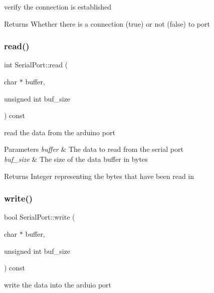verify the connection is established 

\begin{DoxyReturn}{Returns}
Whether there is a connection (true) or not (false) to port 
\end{DoxyReturn}
\mbox{\label{classSerialPort_a23cbb94f2cc75c9f0d40735dfb6e1558}} 
\subsubsection{\texorpdfstring{read()}{read()}}
{\footnotesize\ttfamily int Serial\+Port\+::read (\begin{DoxyParamCaption}\item[{char $\ast$}]{buffer,  }\item[{unsigned int}]{buf\+\_\+size }\end{DoxyParamCaption}) const}



read the data from the arduino port 


\begin{DoxyParams}{Parameters}
{\em buffer} & The data to read from the serial port \\
\hline
{\em buf\+\_\+size} & The size of the data buffer in bytes \\
\hline
\end{DoxyParams}
\begin{DoxyReturn}{Returns}
Integer representing the bytes that have been read in 
\end{DoxyReturn}
\mbox{\label{classSerialPort_aacd98ecf14374a7776efe2a11ec6a541}} 
\subsubsection{\texorpdfstring{write()}{write()}}
{\footnotesize\ttfamily bool Serial\+Port\+::write (\begin{DoxyParamCaption}\item[{char $\ast$}]{buffer,  }\item[{unsigned int}]{buf\+\_\+size }\end{DoxyParamCaption}) const}



write the data into the arduio port 


